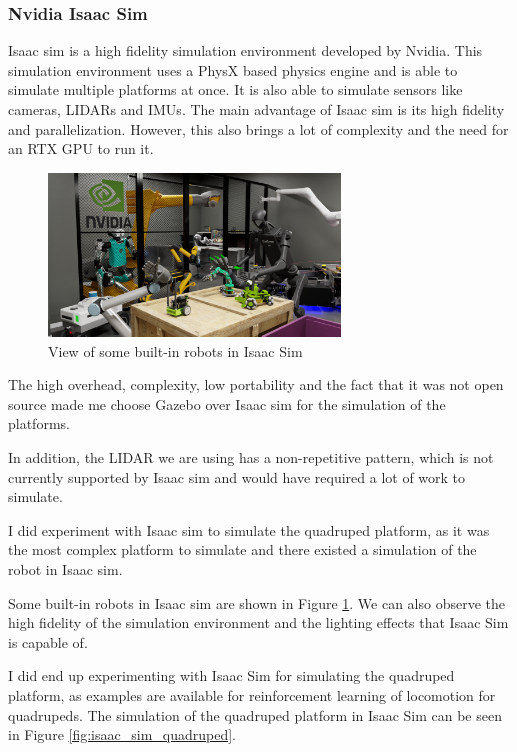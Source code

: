 \documentclass[11pt]{article}
\begin{document}
        \subsubsection{Nvidia Isaac Sim}

            Isaac sim is a high fidelity simulation environment developed by Nvidia. This simulation environment uses a PhysX based physics engine and is able to simulate multiple platforms at once. It is also able to simulate sensors like cameras, LIDARs and IMUs. The main advantage of Isaac sim is its high fidelity and parallelization. However, this also brings a lot of complexity and the need for an RTX GPU to run it.
            
            \begin{figure}[H]
                \centering
                \includegraphics[width=0.69\textwidth]{Images/isaac_sim.png}
                \caption{View of some built-in robots in Isaac Sim}
                \label{fig:isaac_sim_robots}
            \end{figure}
            
            The high overhead, complexity, low portability and the fact that it was not open source made me choose Gazebo over Isaac sim for the simulation of the platforms.

            In addition, the LIDAR we are using has a non-repetitive pattern, which is not currently supported by Isaac sim and would have required a lot of work to simulate.

            I did experiment with Isaac sim to simulate the quadruped platform, as it was the most complex platform to simulate and there existed a simulation of the robot in Isaac sim.

            Some built-in robots in Isaac sim are shown in Figure \ref{fig:isaac_sim_robots}. We can also observe the high fidelity of the simulation environment and the lighting effects that Isaac Sim is capable of.

            I did end up experimenting with Isaac Sim for simulating the quadruped platform, as examples are available for reinforcement learning of locomotion for quadrupeds. The simulation of the quadruped platform in Isaac Sim can be seen in Figure \ref{fig:isaac_sim_quadruped}.
\end{document}
